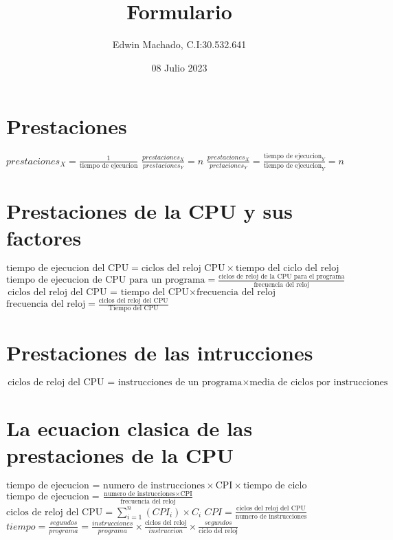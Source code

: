\documentclass{article}
\title{Formulario}
\author{Edwin Machado, C.I:30.532.641}
\date{08 Julio 2023}
\begin{document}
\maketitle
\section{Prestaciones}
        
        \hbox{$prestaciones_{X}=\frac{1}{\text{tiempo de ejecucion}}$}\vspace{6pt}
        \hbox{$\frac{prestaciones_{X}}{prestaciones_{Y}}=n$}\vspace{6pt}
        \hbox{$\frac{prestaciones_{X}}{pretaciones_{Y}}=\frac{\text{tiempo de ejecucion}_{Y}}{\text{tiempo de ejecucion}_{Y}}=n$}\vspace{9pt}
        
\section{Prestaciones de la CPU y sus factores}
        \hbox{$\text{tiempo de ejecucion del CPU}=\text{ciclos del reloj CPU}\times\text{tiempo del ciclo del reloj}$}\vspace{8pt}
       \hbox{$\text{tiempo de ejecucion de CPU para un programa} = \frac{\text{ciclos de reloj de la CPU para el programa}}{\text{frecuencia del reloj}}$}\vspace{8pt}
       \hbox{$\text{ciclos del reloj del CPU = tiempo del CPU}\times\text{frecuencia del reloj}$}\vspace{8pt}
       \hbox{$\text{frecuencia del reloj}=\frac{\text{ciclos del reloj del CPU}}{\text{Tiempo del CPU}}$}\vspace{8pt}
\section{Prestaciones de las intrucciones}
        \hbox{$\text{ciclos de reloj del CPU = instrucciones de un programa}\times \text{media de ciclos por instrucciones}$}\vspace{8pt}
\section{La ecuacion clasica de las prestaciones de la CPU}
        \hbox{$\text{tiempo de ejecucion = numero de instrucciones}\times \text{CPI}\times \text{tiempo de ciclo}$}\vspace{8pt}
        \hbox{$\text{tiempo de ejecucion}=\frac{\text{numero de instrucciones}\times\text{CPI}}{\text{frecuencia del reloj}}$}\vspace{8pt}
        \hbox{$\text{ciclos de reloj del CPU} = \sum_{i=1}^n(CPI_{i})\times C_{i}$}\vspace{8pt}
        \hbox{$CPI = \frac{\text{ciclos del reloj del CPU}}{\text{numero de instrucciones}}$}\vspace{8pt}
        \hbox{$tiempo=\frac{segundos}{programa}=\frac{instrucciones}{programa}\times \frac{\text{ciclos del reloj}}{instruccion}\times\frac{segundos}{\text{ciclo del reloj}}$}\vspace{8pt}
\end{document}
